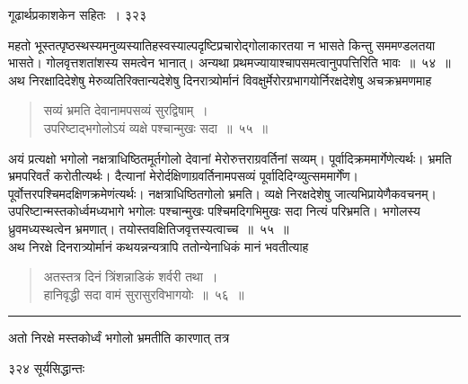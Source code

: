 \documentclass[11pt, openany]{book}
\begin{document}
\newpage


\hspace{3cm} गूढार्थप्रकाशकेन सहितः~। \hfill ३२३
\vspace{1cm}


\noindent महतो भूस्तत्पृष्ठस्थस्यमनुव्यस्यातिहस्वस्याल्पदृष्टिप्रचारोद्गोलाकारतया न भासते किन्तु सममण्डलतया भासते। गोलवृत्तशतांशस्य समत्वेन भानात्। अन्यथा प्रथमज्यायाश्चापसमत्वानुपपत्तिरिति भावः~॥~५४~॥ \\
\noindent अथ निरक्षादिदेशेषु मेरुव्यतिरिक्तान्यदेशेषु दिनरात्र्योर्मानं विवक्षुर्मेरोरग्रभागयोर्निरक्षदेशेषु अचक्रभ्रमणमाह \textendash


\begin{quote}
{\ssi सव्यं भ्रमति देवानामपसव्यं सुरद्विषाम्~।\\
उपरिष्टाद्भगोलोऽयं व्यक्षे पश्चान्मुखः सदा~॥~५५~॥}
\end{quote}
 अयं प्रत्यक्षो भगोलो नक्षत्राधिष्ठितमूर्तगोलो देवानां मेरोरुत्तराग्रवर्तिनां सव्यम्। पूर्वादिक्रममार्गेणेत्यर्थः। भ्रमति भ्रमपरिवर्तं करोतीत्यर्थः। दैत्यानां मेरोर्दक्षिणाग्रवर्तिनामपसव्यं पूर्वादिदिग्व्युत्सममार्गेंण। पूर्वोत्तरपश्चिमदक्षिणक्रमेणंत्यर्थः। नक्षत्राधिष्ठितगोलो भ्रमति। व्यक्षे निरक्षदेशेषु जात्यभिप्रायेणैकवचनम्। उपरिष्टान्मस्तकोर्ध्वमध्यभागे भगोलः पश्चान्मुखः पश्चिमदिगभिमुखः सदा नित्यं परिभ्रमति। भगोलस्य ध्रुवमध्यस्थत्वेन भ्रमणात्। तयोस्तवक्षितिजवृत्तस्यत्वाच्च~॥~५५~॥\\
\noindent अथ निरक्षे दिनरात्र्योर्मानं कथयन्नन्यत्रापि ततोन्येनाधिकं मानं भवतीत्याह \textendash


\begin{quote}
{\ssi अतस्तत्र दिनं त्रिंशन्नाडिकं शर्वरी तथा~।\\
हानिवृद्धी सदा वामं सुरासुरविभागयोः~॥~५६~॥}
%
\end{quote}
\noindent\rule{\linewidth}{.5pt}
\begin{center}
 अतो निरक्षे मस्तकोर्ध्वं भगोलो भ्रमतीति कारणात् तत्र 
\end{center}


\newpage


\noindent ३२४ \hspace{4cm} सूर्यसिद्धान्तः
\vspace{1cm}
\end{document}
